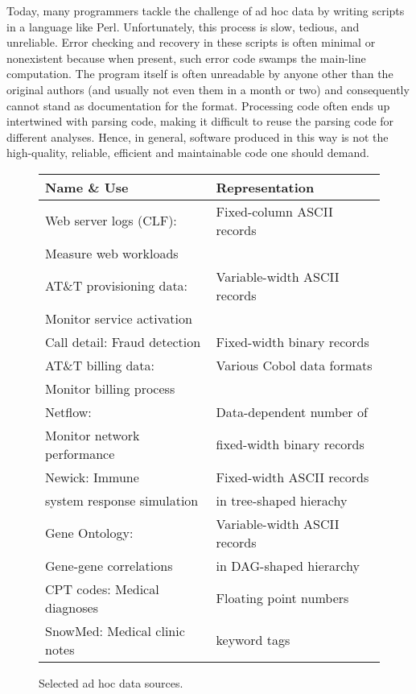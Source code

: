 Today, many programmers tackle the challenge of ad hoc data by writing
scripts in a language like Perl.  Unfortunately, this process is slow,
tedious, and unreliable.  Error checking and recovery in these scripts
is often minimal or nonexistent because when present, such error code
swamps the main-line computation.  The program itself is often
unreadable by anyone other than the original authors (and usually not
even them in a month or two) and consequently cannot stand as
documentation for the format.  Processing code often ends up
intertwined with parsing code, making it difficult to reuse the
parsing code for different analyses. Hence, in general, software
produced in this way is not the high-quality, reliable, efficient and
maintainable code one should demand.

\begin{figure}
\begin{center}
\begin{tabular}{|l|l|}
\hline
Name \& Use   &  Representation               \\ \hline\hline
Web server logs (CLF):  &  Fixed-column ASCII records \\ 
Measure web workloads &                             \\ \hline
AT\&T provisioning data: & Variable-width ASCII records  \\ 
Monitor service activation &                              \\ \hline
Call detail: Fraud detection  &  Fixed-width binary records \\  \hline 
AT\&T billing data: & Various Cobol data formats  \\ 
Monitor billing process   &                             \\ \hline
Netflow:                        & Data-dependent number of     \\ 
Monitor network performance  & fixed-width binary records  \\ \hline
Newick:   Immune                 & Fixed-width ASCII records \\ 
system response simulation & in tree-shaped hierachy\\ \hline                                
Gene Ontology:             & Variable-width ASCII records \\
Gene-gene correlations     & in DAG-shaped hierarchy \\ \hline
CPT codes: Medical diagnoses & Floating point numbers \\ \hline
SnowMed: Medical clinic notes & keyword tags  \\ \hline


\end{tabular}


\caption{Selected ad hoc data sources.}
\label{figure:data-sources}
\end{center}
\end{figure}
 
